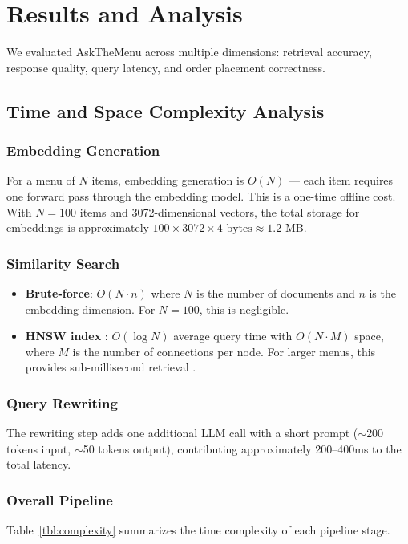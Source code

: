 \section{Results and Analysis}\label{sec:results}

We evaluated AskTheMenu across multiple dimensions: retrieval accuracy, response quality, query latency, and order placement correctness.

\subsection{Time and Space Complexity Analysis}

\subsubsection{Embedding Generation}
For a menu of $N$ items, embedding generation is $O(N)$ — each item requires one forward pass through the embedding model. This is a one-time offline cost. With $N = 100$ items and 3072-dimensional vectors, the total storage for embeddings is approximately $100 \times 3072 \times 4 \text{ bytes} \approx 1.2$ MB.

\subsubsection{Similarity Search}
\begin{itemize}
    \item \textbf{Brute-force}: $O(N \cdot n)$ where $N$ is the number of documents and $n$ is the embedding dimension. For $N = 100$, this is negligible.
    \item \textbf{HNSW index} \cite{Malkov2020HNSW}: $O(\log N)$ average query time with $O(N \cdot M)$ space, where $M$ is the number of connections per node. For larger menus, this provides sub-millisecond retrieval \cite{Wang2024ANNS}.
\end{itemize}

\subsubsection{Query Rewriting}
The rewriting step adds one additional LLM call with a short prompt ($\sim$200 tokens input, $\sim$50 tokens output), contributing approximately 200--400ms to the total latency.

\subsubsection{Overall Pipeline}
Table~\ref{tbl:complexity} summarizes the time complexity of each pipeline stage.


